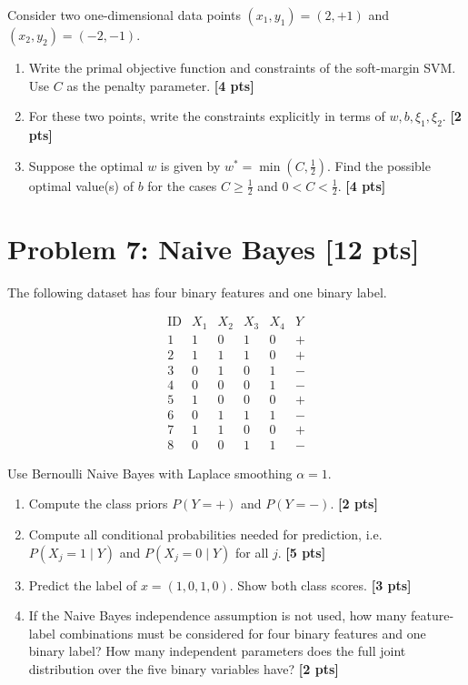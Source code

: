 \documentclass[UTF8,11pt,a4paper]{ctexart}
\newcommand{\pts}[1]{\hfill{\bfseries [#1 pts]}}
\begin{document}
Consider two one-dimensional data points $(x_1,y_1)=(2,+1)$ and $(x_2,y_2)=(-2,-1)$.

\begin{enumerate}[label=(\alph*)]
\item Write the primal objective function and constraints of the soft-margin SVM. Use $C$ as the penalty parameter. \pts{4}
\item For these two points, write the constraints explicitly in terms of $w,b,\xi_1,\xi_2$. \pts{2}
\item Suppose the optimal $w$ is given by $w^*=\min(C,\frac12)$. Find the possible optimal value(s) of $b$ for the cases $C\ge\frac12$ and $0<C<\frac12$. \pts{4}
\end{enumerate}

\section*{Problem 7: Naive Bayes \pts{12}}

The following dataset has four binary features and one binary label.

\[
\begin{array}{c|cccc|c}
\text{ID} & X_1&X_2&X_3&X_4&Y\\
\hline
1&1&0&1&0&+\\
2&1&1&1&0&+\\
3&0&1&0&1&-\\
4&0&0&0&1&-\\
5&1&0&0&0&+\\
6&0&1&1&1&-\\
7&1&1&0&0&+\\
8&0&0&1&1&-
\end{array}
\]

Use Bernoulli Naive Bayes with Laplace smoothing $\alpha=1$.

\begin{enumerate}[label=(\alph*)]
\item Compute the class priors $P(Y=+)$ and $P(Y=-)$. \pts{2}
\item Compute all conditional probabilities needed for prediction, i.e. $P(X_j=1\mid Y)$ and $P(X_j=0\mid Y)$ for all $j$. \pts{5}
\item Predict the label of $x=(1,0,1,0)$. Show both class scores. \pts{3}
\item If the Naive Bayes independence assumption is not used, how many feature-label combinations must be considered for four binary features and one binary label? How many independent parameters does the full joint distribution over the five binary variables have? \pts{2}
\end{enumerate}
\end{document}
